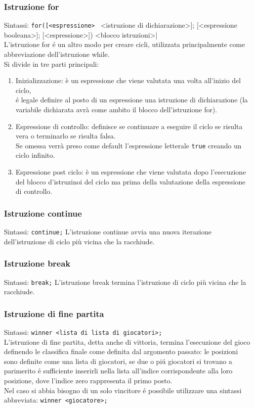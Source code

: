 \subsubsection{Istruzione for}
Sintassi: \lstinline|for([<espressione> | <istruzione di dichiarazione>]; [<espressione booleana>]; [<espressione>]) <blocco istruzioni>| \\
L'istruzione for é un altro modo per creare cicli, utilizzata principalmente come abbreviazione
dell'istruzione while. \\
Si divide in tre parti principali:
\begin{enumerate}
    \item {
        Inizializzazione: è un espressione che viene valutata una volta all'inizio del ciclo, \\
        é legale definire al posto di un espressione una istruzione di dichiarazione
        (la variabile dichiarata avrà come ambito il blocco dell'istruzione for).
    }
    \item { 
        Espressione di controllo: definisce se continuare a eseguire il ciclo se risulta vera 
        o terminarlo se risulta falsa. \\
        Se omessa verrà preso come default l'espressione letterale \lstinline|true| creando un ciclo infinito.
    }
    \item {
        Espressione post ciclo: è un espressione che viene valutata dopo l'esecuzione del blocco d'istruzinoi 
        del ciclo ma prima della valutazione della espressione di controllo.
    }
\end{enumerate}

\subsubsection{Istruzione continue}
Sintassi: \lstinline|continue;|
L'istruzione continue avvia una nuova iterazione dell'istruzione di ciclo più vicina che la racchiude.

\subsubsection{Istruzione break}
Sintassi: \lstinline|break;|
L'istruzione break termina l'istruzione di ciclo più vicina che la racchiude.

\subsubsection{Istruzione di fine partita}
Sintassi: \lstinline|winner <lista di lista di giocatori>;| \\
L'istruzione di fine partita, detta anche di vittoria, termina l'esecuzione del gioco definendo 
le classifica finale come definita dal argomento passato: le posizioni sono definite come una lista di giocatori,
se due o piú giocatori si trovano a parimerito é sufficiente inserirli nella lista all'indice corrispondente 
alla loro posizione, dove l'indice zero rappresenta il primo posto. \\
Nel caso si abbia bisogno di un solo vincitore é possibile utilizzare una sintassi abbreviata: 
\lstinline|winner <giocatore>;| 

